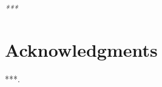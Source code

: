 \thispagestyle{empty}

\begin{flushright}
    \emph{\scriptsize{
            ***}}
\end{flushright}

\clearpage
\thispagestyle{empty}
\null\newpage
\clearpage

\chapter*{Acknowledgments}
\thispagestyle{empty}
***.

\clearpage
\thispagestyle{empty}
\null\newpage
\clearpage
